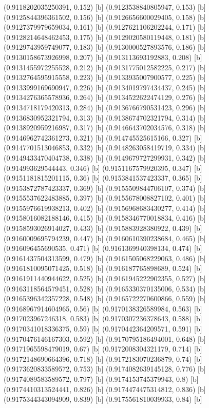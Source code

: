 {{{(0.9118202035250391, 0.152) [b] 
(0.9123538840805947, 0.153) [b] 
(0.9125844396361502, 0.156) [b] 
(0.9126656600029405, 0.158) [b] 
(0.9127379979659034, 0.161) [b] 
(0.9127621106202244, 0.171) [b] 
(0.9128214648462453, 0.175) [b] 
(0.9129020580119448, 0.181) [b] 
(0.9129743959749077, 0.183) [b] 
(0.9130000527893576, 0.186) [b] 
(0.9130158673926998, 0.207) [b] 
(0.913113693192883, 0.208) [b] 
(0.9131455972255528, 0.212) [b] 
(0.9131775012582225, 0.217) [b] 
(0.9132764595915558, 0.223) [b] 
(0.9133935007900577, 0.225) [b] 
(0.9133999169690947, 0.226) [b] 
(0.9134019797434437, 0.245) [b] 
(0.9134276365578936, 0.264) [b] 
(0.9134522622474129, 0.276) [b] 
(0.9134718179420313, 0.284) [b] 
(0.9136766790531423, 0.296) [b] 
(0.9136830952321794, 0.313) [b] 
(0.9138674702321794, 0.314) [b] 
(0.9138920959216987, 0.317) [b] 
(0.9146643702034576, 0.318) [b] 
(0.9146962742361273, 0.321) [b] 
(0.914745525615166, 0.327) [b] 
(0.9147701513046853, 0.332) [b] 
(0.9148263058419719, 0.334) [b] 
(0.9149433470404738, 0.338) [b] 
(0.9149679727299931, 0.342) [b] 
(0.914993629544443, 0.346) [b] 
(0.9151167579920395, 0.347) [b] 
(0.9151181815201115, 0.36) [b] 
(0.9153841537423337, 0.365) [b] 
(0.9153872787423337, 0.369) [b] 
(0.9155509844706107, 0.374) [b] 
(0.9155537622483885, 0.397) [b] 
(0.9155678008827102, 0.401) [b] 
(0.9155976619938213, 0.402) [b] 
(0.9156968683430277, 0.414) [b] 
(0.9158016082188146, 0.415) [b] 
(0.9158346770018834, 0.416) [b] 
(0.9158593026914027, 0.433) [b] 
(0.915883928380922, 0.439) [b] 
(0.9160009695794239, 0.447) [b] 
(0.9160610390238684, 0.465) [b] 
(0.916096455690535, 0.471) [b] 
(0.9161369940398134, 0.474) [b] 
(0.9161437504313599, 0.479) [b] 
(0.9161505068229063, 0.486) [b] 
(0.9161810095071425, 0.518) [b] 
(0.916187765898689, 0.524) [b] 
(0.9161911440944622, 0.525) [b] 
(0.9161945222902355, 0.527) [b] 
(0.9163118564579451, 0.528) [b] 
(0.9165330370135006, 0.534) [b] 
(0.9165396342357228, 0.548) [b] 
(0.9165722270600866, 0.559) [b] 
(0.9168967914604965, 0.56) [b] 
(0.9170138326589984, 0.563) [b] 
(0.917023967246318, 0.583) [b] 
(0.9170307236378643, 0.588) [b] 
(0.9170341018336375, 0.59) [b] 
(0.9170442364209571, 0.591) [b] 
(0.9170476146167303, 0.592) [b] 
(0.9170795186494001, 0.648) [b] 
(0.9171965598479019, 0.67) [b] 
(0.9172008304321179, 0.714) [b] 
(0.9172148690664396, 0.718) [b] 
(0.9172183070236879, 0.74) [b] 
(0.9173620833589572, 0.753) [b] 
(0.9174082639145128, 0.776) [b] 
(0.9174089583589572, 0.797) [b] 
(0.9174153745379943, 0.8) [b] 
(0.9174410313524441, 0.826) [b] 
(0.9174474475314812, 0.836) [b] 
(0.9175344343094909, 0.839) [b] 
(0.9175561810039933, 0.84) [b] 
}}}
